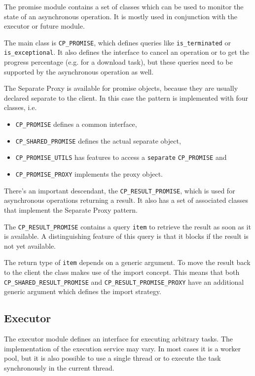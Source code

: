 The promise module contains a set of classes which can be used to monitor the state of an asynchronous operation.
It is mostly used in conjunction with the executor or future module.

The main class is \lstinline!CP_PROMISE!, which defines queries like \lstinline!is_terminated! or \lstinline!is_exceptional!.
It also defines the interface to cancel an operation or to get the progress percentage (e.g. for a download task), but these queries need to be supported by the asynchronous operation as well.

The Separate Proxy  is available for promise objects, because they are usually declared separate to the client.
In this case the pattern is implemented with four classes, i.e.
\begin{itemize}
 \item \lstinline!CP_PROMISE! defines a common interface,
 \item \lstinline!CP_SHARED_PROMISE! defines the actual separate object,
 \item \lstinline!CP_PROMISE_UTILS! has features to access a \lstinline!separate! \lstinline!CP_PROMISE! and
 \item \lstinline!CP_PROMISE_PROXY! implements the proxy object.
\end{itemize}

There's an important descendant, the \lstinline!CP_RESULT_PROMISE!, which is used for asynchronous operations returning a result.
It also has a set of associated classes that implement the Separate Proxy pattern.

The \lstinline!CP_RESULT_PROMISE! contains a query \lstinline!item! to retrieve the result as soon as it is available.
A distinguishing feature of this query is that it blocks if the result is not yet available.

The return type of \lstinline!item! depends on a generic argument.
To move the result back to the client the class makes use of the import concept.
This means that both \lstinline!CP_SHARED_RESULT_PROMISE! and \lstinline!CP_RESULT_PROMISE_PROXY! have an additional generic argument which defines the import strategy.

\subsection{Executor}
\label{sec:executor}

The executor module defines an interface for executing arbitrary tasks.
The implementation of the execution service may vary.
In most cases it is a worker pool, but it is also possible to use a single thread or to execute the task synchronously in the current thread.


